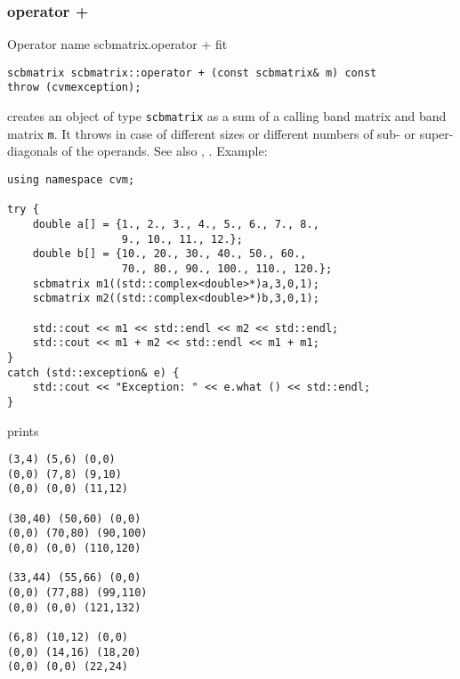 \subsubsection{operator +}
Operator%
\pdfdest name {scbmatrix.operator +} fit
\begin{verbatim}
scbmatrix scbmatrix::operator + (const scbmatrix& m) const
throw (cvmexception);
\end{verbatim}
creates an object of type \verb"scbmatrix" as a sum of
a calling band matrix and  band matrix \verb"m".
It throws  
in case of different sizes or different numbers of sub- or super-diagonals
of the operands.
See also , .
Example:
\begin{Verbatim}
using namespace cvm;

try {
    double a[] = {1., 2., 3., 4., 5., 6., 7., 8.,
                  9., 10., 11., 12.};
    double b[] = {10., 20., 30., 40., 50., 60., 
                  70., 80., 90., 100., 110., 120.};
    scbmatrix m1((std::complex<double>*)a,3,0,1);
    scbmatrix m2((std::complex<double>*)b,3,0,1);

    std::cout << m1 << std::endl << m2 << std::endl;
    std::cout << m1 + m2 << std::endl << m1 + m1;
}
catch (std::exception& e) {
    std::cout << "Exception: " << e.what () << std::endl;
}
\end{Verbatim}
prints
\begin{Verbatim}
(3,4) (5,6) (0,0)
(0,0) (7,8) (9,10)
(0,0) (0,0) (11,12)

(30,40) (50,60) (0,0)
(0,0) (70,80) (90,100)
(0,0) (0,0) (110,120)

(33,44) (55,66) (0,0)
(0,0) (77,88) (99,110)
(0,0) (0,0) (121,132)

(6,8) (10,12) (0,0)
(0,0) (14,16) (18,20)
(0,0) (0,0) (22,24)
\end{Verbatim}
\newpage



